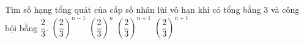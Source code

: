 \begin{ex}%
  Tìm số hạng tổng quát của cấp số nhân lùi vô hạn khi có tổng bằng $3$ và công bội bằng $\dfrac{2}{3}$.
  \choice
  {\True $\left(\dfrac{2}{3}\right)^{n - 1}$}
  {$\left( \dfrac{2}{3} \right)^n$}
  {$\left( \dfrac{2}{3} \right)^{n+1}$}
  {$\left( \dfrac{2}{3} \right)^{n+1}$}
\end{ex}

